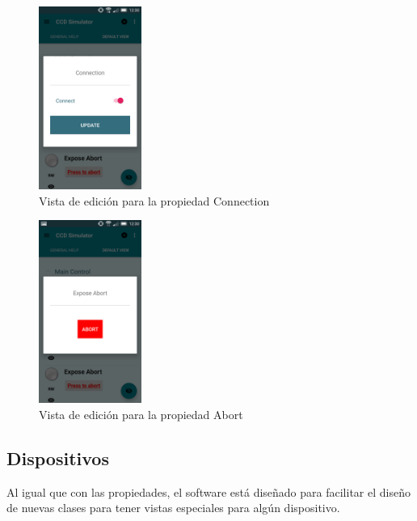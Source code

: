 \begin{figure}[!ht]
  \begin{center}
  \includegraphics[width=0.3\textwidth]{../images/connection_property.png}
  \caption{Vista de edición para la propiedad Connection}
  \label{fig:connect_edit_view}
  \end{center}
\end{figure}

\begin{figure}[!ht]
  \begin{center}
  \includegraphics[width=0.3\textwidth]{../images/abort_property.png}
  \caption{Vista de edición para la propiedad Abort}
  \label{fig:abort_edit_view}
  \end{center}
\end{figure}

\newpage
\subsection{Dispositivos}
Al igual que con las propiedades, el software está diseñado para facilitar el diseño de nuevas clases para tener vistas especiales para algún dispositivo.

